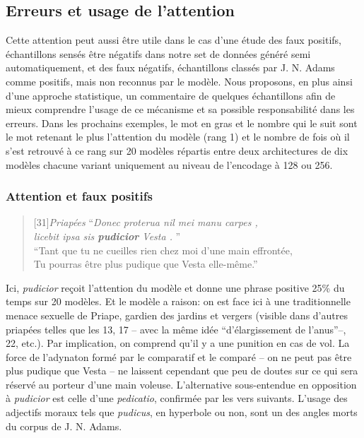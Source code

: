 \subsection{Erreurs et usage de l'attention}

Cette attention peut aussi être utile dans le cas d'une étude des faux positifs, échantillons sensés être négatifs dans notre set de données généré semi automatiquement, et des faux négatifs, échantillons classés par J. N. Adams comme positifs, mais non reconnus par le modèle. Nous proposons, en plus ainsi d'une approche statistique, un commentaire de quelques échantillons afin de mieux comprendre l'usage de ce mécanisme et sa possible responsabilité dans les erreurs. Dans les prochains exemples, le mot en gras et le nombre qui le suit sont le mot retenant le plus l'attention du modèle (rang 1) et le nombre de fois où il s'est retrouvé à ce rang sur 20 modèles répartis entre deux architectures de dix modèles chacune variant uniquement au niveau de l'encodage à 128 ou 256.

\subsubsection{Attention et faux positifs}

\begin{quote}[31]{\textit{Priapées}}
    \enquote{\textit{Donec proterua nil mei manu carpes ,{\\}  licebit ipsa sis \textbf{pudicior} Vesta . }} \\
    \enquote{Tant que tu ne cueilles rien chez moi d’une main effrontée, {\\} Tu pourras être plus pudique que Vesta elle-même.}
\end{quote}

Ici, \textit{pudicior} reçoit l'attention du modèle et donne une phrase positive 25\% du temps sur 20 modèles. Et le modèle a raison: on est face ici à une traditionnelle menace sexuelle de Priape, gardien des jardins et vergers (visible dans d'autres priapées telles que les 13, 17 -- avec la même idée ``d'élargissement de l'anus''--, 22, etc.). Par implication, on comprend qu'il y a une punition en cas de vol. La force de l'adynaton formé par le comparatif et le comparé -- on ne peut pas être plus pudique que Vesta -- ne laissent cependant que peu de doutes sur ce qui sera réservé au porteur d'une main voleuse. L'alternative sous-entendue en opposition à \textit{pudicior} est celle d'une \textit{pedicatio}, confirmée par les vers suivants. L'usage des adjectifs moraux tels que \textit{pudicus}, en hyperbole ou non, sont un des angles morts du corpus de J. N. Adams.

